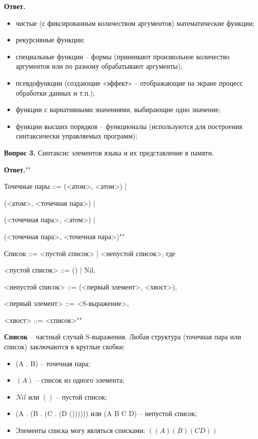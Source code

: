 \textbf{Ответ.} 
	
\begin{itemize}
	\item чистые (с фиксированным количеством аргументов) математические функции;
	\item рекурсивные функции;
	\item специальные функции – формы (принимают произвольное количество аргументов или по разному обрабатывают аргументы);
	\item псевдофункции (создающие «эффект» – отображающие на экране процесс обработки данных и т.п.);
	\item функции с вариативными значениями, выбирающие одно значение;
	\item функции высших порядков – функционалы (используются для построения синтаксически управляемых программ);
\end{itemize}

\textbf{Вопрос 3.} Синтаксис элементов языка и их представление в памяти.


\textbf{Ответ.}""\newline


Точечные пары ::= (<атом>, <атом>) |

(<атом>, <точечная пара>) |

(<точечная пара>, <атом>) |

(<точечная пара>, <точечная пара>)""\newline

\indent Список ::= <пустой список> | <непустой список>, где

<пустой список> ::= () | Nil,

<непустой список> ::= (<первый элемент>, <хвост>),

<первый элемент> ::= <S-выражение>,

<хвост> ::= <список>""\newline


\indent \textbf{Список} -- частный случай S-выражения. Любая структура (точечная пара или список) заключаются в круглые скобки:


\begin{itemize}

	\item (A . B) -- точечная пара;

	\item $(A)$ -- список из одного элемента;

	\item $Nil$ или $()$ -- пустой список;

	\item (A . (B . (C . (D ()))))) или (A B C D) -- непустой список;

	\item Элементы списка могу являться списками: $((A)(B)(CD))$

\end{itemize}


